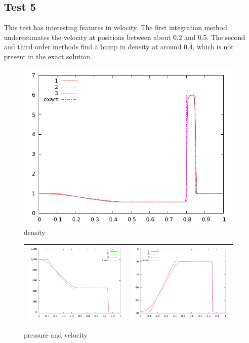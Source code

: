 \documentclass[letterpaper,12pt]{article}
\begin{document}
\clearpage

\subsection{Test 5}
This test has interesting features in velocity. The first integration method underestimates the velocity at positions between about 0.2 and 0.5. The second and third order methods find a bump in density at around 0.4, which is not present in the exact solution.

\begin{figure}[h]
  \begin{center}
     \includegraphics[width=.78\textwidth]{den_T5.png}	
  \end{center}
  \caption{density}
\end{figure}

\begin{figure}
  \begin{center}
	\begin{tabular}{cc}
      \includegraphics[width=.425\textwidth]{prs_T5.png} &
	  \includegraphics[width=.425\textwidth]{vel_T5.png}
	\end{tabular}
  \end{center}
  \caption{pressure and velocity}
\end{figure}
\clearpage
\end{document}
